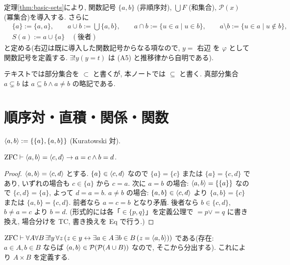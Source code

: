 \begin{dfn}
  定理\ref{thm:basic-sets}により, 関数記号 $\{a,b\}$ (非順序対), $\bigcup F$ (和集合), $\mathcal{P}(x)$ (冪集合)を導入する. さらに
  \begin{align*}
    & \{a\} := \{a,a\}, \qquad a \cup b := \textstyle\bigcup\{a,b\}, \qquad a \cap b := \{u \in a \mid u \in b\}, \qquad a \setminus b := \{u \in a \mid u \notin b\}, \\
    & S(a) := a \cup \{a\} \quad (\text{後者})
  \end{align*}
  と定める(右辺は既に導入した関数記号からなる項なので, $y = $ 右辺 を $\varphi$ として関数記号を定義する. $\exists ! y(y = t)$ は (A5) と推移律から自明である).
\end{dfn}

\begin{rem}
  テキストでは部分集合を $\subset$ と書くが, 本ノートでは $\subseteq$ と書く. 真部分集合 $a \subsetneq b$ は $a \subseteq b \land a \neq b$ の略記である.
\end{rem}

\section{順序対・直積・関係・関数}

\begin{dfn}[順序対]
  $\langle a,b\rangle := \{\{a\},\{a,b\}\}$ (Kuratowski 対).
\end{dfn}

\begin{thm}\label{thm:pair}
  $\mathrm{ZFC} \vdash \langle a,b\rangle = \langle c,d\rangle \to a = c \land b = d$.
\end{thm}
\begin{proof}
  $\langle a,b\rangle = \langle c,d\rangle$ とする. $\{a\} \in \langle c,d\rangle$ なので $\{a\} = \{c\}$ または $\{a\} = \{c,d\}$ であり, いずれの場合も $c \in \{a\}$ から $c = a$. 次に $a = b$ の場合: $\langle a,b\rangle = \{\{a\}\}$ なので $\{c,d\} = \{a\}$, よって $d = a = b$. $a \neq b$ の場合: $\{a,b\} \in \langle c,d\rangle$ より $\{a,b\} = \{c\}$ または $\{a,b\} = \{c,d\}$. 前者なら $a = c = b$ となり矛盾. 後者なら $b \in \{c,d\}$, $b \neq a = c$ より $b = d$.
  (形式的には各「$\in \{p,q\}$」を定義公理で $= p \lor = q$ に書き換え, 場合分けを TC, 書き換えを Eq で行う.)
\end{proof}

\begin{dfn}[直積]
  $\mathrm{ZFC} \vdash \forall A\forall B\,\exists ! y\,\forall z\,(z \in y \leftrightarrow \exists a \in A\,\exists b \in B\,(z = \langle a,b\rangle))$ である(存在: $a \in A, b \in B$ ならば $\langle a,b\rangle \in \mathcal{P}(\mathcal{P}(A \cup B))$ なので, そこから分出する). これにより $A \times B$ を定義する.
\end{dfn}


